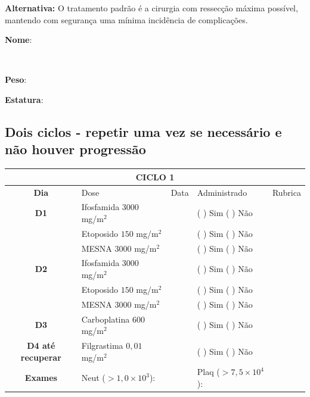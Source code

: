 \documentclass[11pt,a4paper,oldfontcommands]{memoir}
\def\entrywithlabel[#1]#2{\parbox{#1}{{\small #2:} \hrulefill}}
\begin{document}
\textbf{Alternativa:} O tratamento padrão é a cirurgia com ressecção máxima possível, mantendo com segurança uma mínima incidência de complicações. 
\\[0.4cm]
\entrywithlabel[1\hsize]{\textbf{Nome}}\hfill
\\[0.3cm]
\entrywithlabel[.45\hsize]{\textbf{Peso}}\hfill  \entrywithlabel[.45\hsize]{\textbf{Estatura}}

\subsection{Dois ciclos - repetir uma vez se necessário e não houver progressão}

\begin{center}
\begin{table}[H]
\begin{tabular}{c|p{5cm}|p{1.4cm}|p{3.3cm}|p{1.8cm}}
	\hline
	\multicolumn{5}{c}{\textbf{CICLO 1}}\\
\hline
    \multicolumn{1}{c|}{\multirow{1}{*}{\textbf{Dia}}}&{Dose}&{Data}&{Administrado}&{Rubrica} \\
    \hline
    \multicolumn{1}{c|}{\multirow{1}{*}{\textbf{D1}}}&{Ifosfamida \(3000\) mg/m\(^2\)}&&{(  ) Sim (  ) Não}&\\
    \multicolumn{1}{c|}{\multirow{1}{*}{\textbf{}}}&{Etoposido \(150\) mg/m\(^2\)}&&{(  ) Sim (  ) Não}&\\
    \multicolumn{1}{c|}{\multirow{1}{*}{\textbf{}}}&{MESNA \(3000\) mg/m\(^2\)}&&{(  ) Sim (  ) Não}&\\
    \multicolumn{1}{c|}{\multirow{1}{*}{\textbf{D2}}}&{Ifosfamida \(3000\) mg/m\(^2\)}&&{(  ) Sim (  ) Não}&\\
    \multicolumn{1}{c|}{\multirow{1}{*}{\textbf{}}}&{Etoposido \(150\) mg/m\(^2\)}&&{(  ) Sim (  ) Não}&\\
    \multicolumn{1}{c|}{\multirow{1}{*}{\textbf{}}}&{MESNA \(3000\) mg/m\(^2\)}&&{(  ) Sim (  ) Não}&\\
     \multicolumn{1}{c|}{\multirow{1}{*}{\textbf{D3}}}&{Carboplatina \(600\) mg/m\(^2\)}&&{(  ) Sim (  ) Não}&\\
    \hline
    \multicolumn{1}{c|}{\multirow{1}{*}{\textbf{D4 até recuperar}}}&{Filgrastima \(0,01\) mg/m\(^2\)}&&{(  ) Sim (  ) Não}&\\
    \hline
    \multicolumn{1}{c|}{\multirow{1}{*}{\textbf{Exames}}}&\multicolumn{2}{l|}{Neut (\(>1,0\times10^3\)):}&{Plaq (\(>7,5\times10^4\)):}&{}\\
    \hline
\end{tabular}
\end{table}


\end{center}
\end{document}
